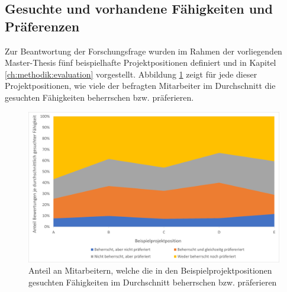 
\subsection{Gesuchte und vorhandene Fähigkeiten und Präferenzen}
\label{ch:ergebnisse:umfrageMitarbeiter:projekte}
Zur Beantwortung der Forschungsfrage wurden im Rahmen der vorliegenden Master-Thesis fünf beispielhafte Projektpositionen definiert und in Kapitel \ref{ch:methodik:evaluation} vorgestellt. Abbildung \ref{fig:ergebnisse:analyse:abb5} zeigt für jede dieser Projektpositionen, wie viele der befragten Mitarbeiter im Durchschnitt die gesuchten Fähigkeiten beherrschen bzw. präferieren.

\begin{figure}[h]
	\centering
	\includegraphics[width=1\textwidth]{gfx/anteil-bewertungen-je-projektposition.png}
	\caption{Anteil an Mitarbeitern, welche die in den Beispielprojektpositionen gesuchten Fähigkeiten im Durchschnitt beherrschen bzw. präferieren}
	\label{fig:ergebnisse:analyse:abb5}
\end{figure}

